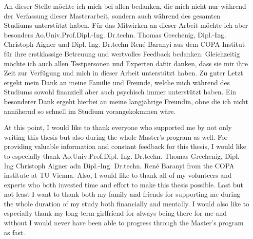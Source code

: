 \documentclass[draft,final]{vutinfth} %
\begin{document}
\frontmatter %

\addstatementpage

\begin{danksagung*}
An dieser Stelle möchte ich mich bei allen bedanken, die mich nicht nur während der Verfassung dieser Masterarbeit, sondern auch während des gesamten Studiums unterstützt haben. Für das Mitwirken an dieser Arbeit möchte ich aber besonders Ao.Univ.Prof.Dipl.-Ing. Dr.techn. Thomas Grechenig, Dipl.-Ing. Christoph Aigner und Dipl.-Ing. Dr.techn René Baranyi aus dem COPA-Institut für ihre erstklassige Betreuung und wertvolles Feedback bedanken. Gleichzeitig möchte ich auch allen Testpersonen und Experten dafür danken, dass sie mir ihre Zeit zur Verfügung und mich in dieser Arbeit unterstützt haben. Zu guter Letzt ergeht mein Dank an meine Familie und Freunde, welche mich während des Studiums sowohl finanziell aber auch psychisch immer unterstützt haben. Ein besonderer Dank ergeht hierbei an meine langjährige Freundin, ohne die ich nicht annähernd so schnell im Studium vorangekokmmen wäre. \end{danksagung*}

\begin{acknowledgements*}
At this point, I would like to thank everyone who supported me by not only writing this thesis but also during the whole Master's program as well. For providing valuable information and constant feedback for this thesis, I would like to especially thank Ao.Univ.Prof.Dipl.-Ing. Dr.techn. Thomas Grechenig, Dipl.-Ing Christoph Aigner adn Dipl.-Ing. Dr.techn. René Baranyi from the COPA institute at TU Vienna. Also, I would like to thank all of my volunteers and experts who both invested time and effort to make this thesis possible. Last but not least I want to thank both my family and friends for supporting me during the whole duration of my study both financially and mentally. I would also like to especially thank my long-term girlfriend for always being there for me and without I would never have been able to progress through the Master's program as fast.
\end{acknowledgements*}
\end{document}
